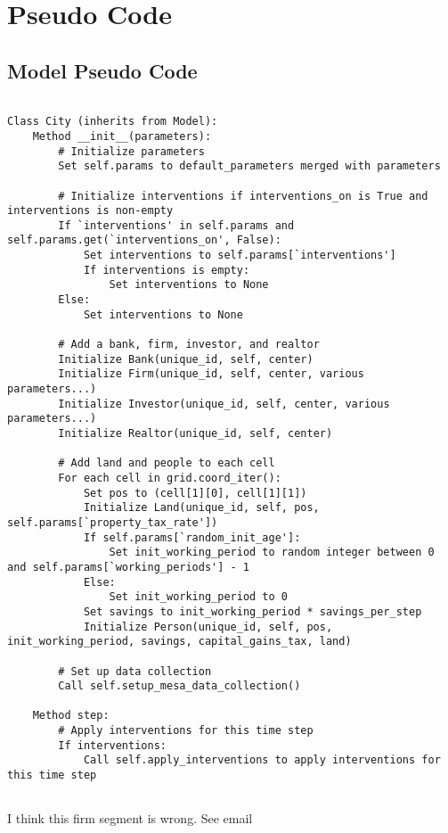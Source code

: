 \chapter{Pseudo Code} \label{appendix-pseudocode}
\section{Model Pseudo Code}
{\small\begin{verbatim} 

Class City (inherits from Model):
    Method __init__(parameters):
        # Initialize parameters
        Set self.params to default_parameters merged with parameters

        # Initialize interventions if interventions_on is True and interventions is non-empty
        If `interventions' in self.params and self.params.get(`interventions_on', False):
            Set interventions to self.params[`interventions']
            If interventions is empty:
                Set interventions to None
        Else:
            Set interventions to None

        # Add a bank, firm, investor, and realtor
        Initialize Bank(unique_id, self, center)
        Initialize Firm(unique_id, self, center, various parameters...)
        Initialize Investor(unique_id, self, center, various parameters...)
        Initialize Realtor(unique_id, self, center)

        # Add land and people to each cell
        For each cell in grid.coord_iter():
            Set pos to (cell[1][0], cell[1][1])
            Initialize Land(unique_id, self, pos, self.params[`property_tax_rate'])
            If self.params[`random_init_age']:
                Set init_working_period to random integer between 0 and self.params[`working_periods'] - 1
            Else:
                Set init_working_period to 0
            Set savings to init_working_period * savings_per_step
            Initialize Person(unique_id, self, pos, init_working_period, savings, capital_gains_tax, land)

        # Set up data collection
        Call self.setup_mesa_data_collection()

    Method step:
        # Apply interventions for this time step
        If interventions:
            Call self.apply_interventions to apply interventions for this time step
            
\end{verbatim}{\color{red} I think this firm segment is wrong. See email}\begin{verbatim}


\end{verbatim}}
